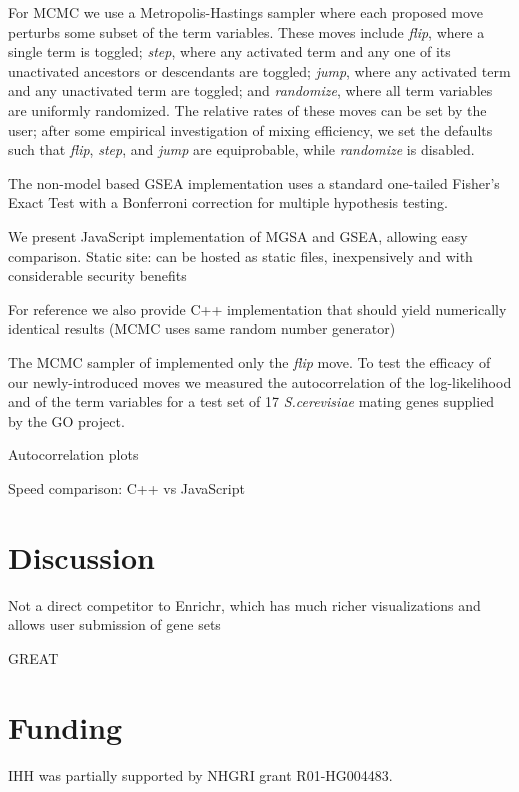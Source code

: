 For MCMC we use a Metropolis-Hastings sampler where each proposed move perturbs some subset of the term variables.
These moves include {\em flip}, where a single term is toggled;
{\em step}, where any activated term and any one of its unactivated ancestors or descendants are toggled;
{\em jump}, where any activated term and any unactivated term are toggled; and
{\em randomize}, where all term variables are uniformly randomized.
The relative rates of these moves can be set by the user;
after some empirical investigation of mixing efficiency, we set the defaults such that
{\em flip}, {\em step}, and {\em jump} are equiprobable,
while {\em randomize} is disabled.

The non-model based GSEA implementation uses a standard one-tailed Fisher's Exact Test with a Bonferroni correction
for multiple hypothesis testing.

We present JavaScript implementation of MGSA and GSEA, allowing easy comparison.
Static site: can be hosted as static files, inexpensively and with considerable security benefits

For reference we also provide C++ implementation that should yield numerically identical results
(MCMC uses same random number generator)

The MCMC sampler of \cite{pmid20172960} implemented only the {\em flip} move.
To test the efficacy of our newly-introduced moves we measured the autocorrelation of the log-likelihood
and of the term variables for a test set of 17 {\em S.cerevisiae} mating genes supplied by the GO project.

Autocorrelation plots

Speed comparison: C++ vs JavaScript

\section*{Discussion}

Not a direct competitor to Enrichr, which has much richer visualizations and allows user submission of gene sets

GREAT \cite{pmid20436461}

\section*{Funding}

IHH was partially supported by NHGRI grant R01-HG004483.


%
%
%
%
%
%
%
%



